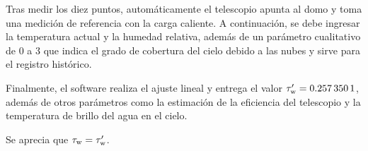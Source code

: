 Tras medir los diez puntos, automáticamente el telescopio apunta al domo y toma una medición de referencia con la carga caliente. A continuación, se debe ingresar la temperatura actual y la humedad relativa, además de un parámetro cualitativo de \num{0} a \num{3} que indica el grado de cobertura del cielo debido a las nubes y sirve para el registro histórico.

Finalmente, el software realiza el ajuste lineal y entrega el valor $\tau_\textnormal{w}'=\num{0.2573501}$, además de otros parámetros como la estimación de la eficiencia del telescopio y la temperatura de brillo del agua en el cielo.

Se aprecia que $\tau_\textnormal{w}=\tau_\textnormal{w}'$.